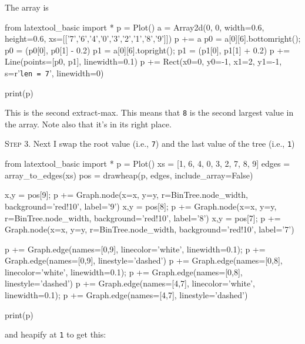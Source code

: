 The array is

\begin{python}
from latextool_basic import *
p = Plot()
a = Array2d(0, 0, width=0.6, height=0.6, 
             xs=[['7','6','4','0','3','2','1','8','9']])
p += a
p0 = a[0][6].bottomright(); p0 = (p0[0], p0[1] - 0.2)
p1 = a[0][6].topright(); p1 = (p1[0], p1[1] + 0.2)
p += Line(points=[p0, p1], linewidth=0.1)
p += Rect(x0=0, y0=-1, x1=2, y1=-1, s=r'\texttt{len = 7}', linewidth=0)

print(p)
\end{python}

This is the second extract-max.
This means that \verb!8! is the second largest value in the array.
Note also that it's in its right place.


\textsc{Step 3}.
Next I swap the root value (i.e., \texttt{7}) and the last value
of the tree (i.e., \texttt{1})

\begin{python}
from latextool_basic import *
p = Plot()
xs = [1, 6, 4, 0, 3, 2, 7, 8, 9]
edges = array_to_edges(xs)
pos = drawheap(p, edges, include_array=False)

x,y = pos[9]; p += Graph.node(x=x, y=y, r=BinTree.node_width, background='red!10', label='9')
x,y = pos[8]; p += Graph.node(x=x, y=y, r=BinTree.node_width, background='red!10', label='8')
x,y = pos[7]; p += Graph.node(x=x, y=y, r=BinTree.node_width, background='red!10', label='7')

p += Graph.edge(names=[0,9], linecolor='white', linewidth=0.1); p += Graph.edge(names=[0,9], linestyle='dashed')
p += Graph.edge(names=[0,8], linecolor='white', linewidth=0.1); p += Graph.edge(names=[0,8], linestyle='dashed')
p += Graph.edge(names=[4,7], linecolor='white', linewidth=0.1); p += Graph.edge(names=[4,7], linestyle='dashed')

print(p)
\end{python}

and heapify at \texttt{1} to get this:

